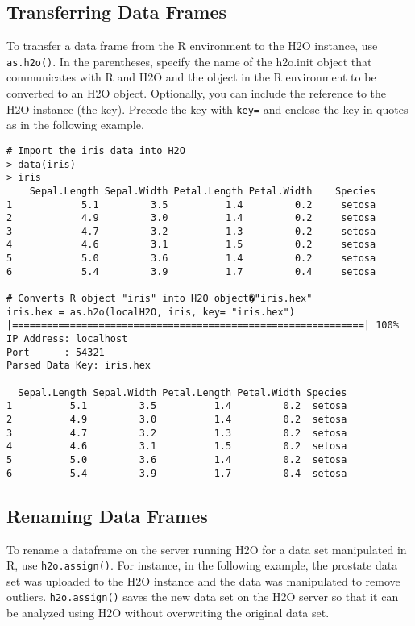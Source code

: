 \subsection{Transferring Data Frames}
To transfer a data frame from the R environment to the H2O instance, use  {\texttt{as.h2o()}}. In the parentheses, specify the name of the h2o.init object that communicates with R and H2O and the object in the R environment to be converted to an H2O object. Optionally, you can include the reference to the H2O instance (the key). Precede the key with {\texttt{key=}} and enclose the key in quotes as in the following example. 

\begin{lstlisting}[style=R]
# Import the iris data into H2O
> data(iris)
> iris
    Sepal.Length Sepal.Width Petal.Length Petal.Width    Species
1            5.1         3.5          1.4         0.2     setosa
2            4.9         3.0          1.4         0.2     setosa
3            4.7         3.2          1.3         0.2     setosa
4            4.6         3.1          1.5         0.2     setosa
5            5.0         3.6          1.4         0.2     setosa
6            5.4         3.9          1.7         0.4     setosa

# Converts R object "iris" into H2O object�"iris.hex"
iris.hex = as.h2o(localH2O, iris, key= "iris.hex")
|=============================================================| 100%
IP Address: localhost 
Port      : 54321 
Parsed Data Key: iris.hex 

  Sepal.Length Sepal.Width Petal.Length Petal.Width Species
1          5.1         3.5          1.4         0.2  setosa
2          4.9         3.0          1.4         0.2  setosa
3          4.7         3.2          1.3         0.2  setosa
4          4.6         3.1          1.5         0.2  setosa
5          5.0         3.6          1.4         0.2  setosa
6          5.4         3.9          1.7         0.4  setosa
\end{lstlisting}


\subsection{Renaming Data Frames}

To rename a dataframe on the server running H2O for a data set manipulated in R, use {\texttt{h2o.assign()}}. For instance, in the following example, the prostate data set was uploaded to the H2O instance and the data was manipulated to remove outliers. {\texttt{h2o.assign()}} saves the new data set on the H2O server so that it can be analyzed using H2O without overwriting the original data set.  

